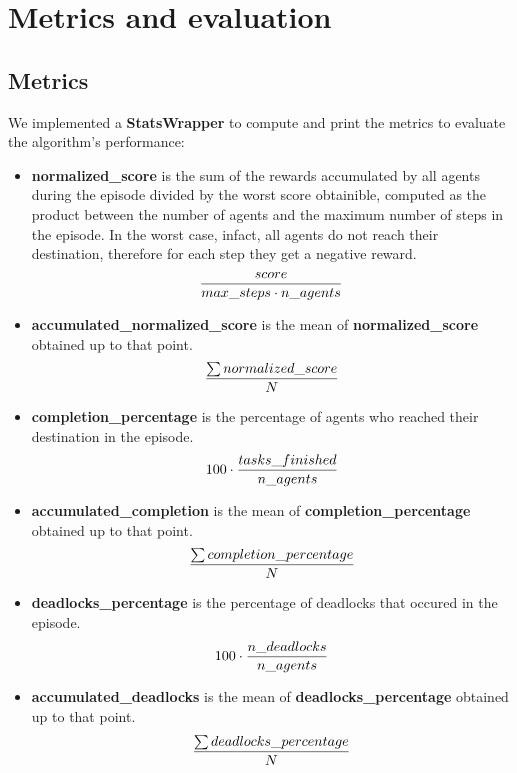 \documentclass[11pt, a4paper, hidelinks]{report}
\begin{document}
\section{Metrics and evaluation}\label{sec:metrics-and-evaluation}

\subsection{Metrics}\label{subsec:metrics}
We implemented a \textbf{StatsWrapper} to compute and print the metrics to evaluate the algorithm's performance:

\begin{itemize}
\item \textbf{normalized\_score} is the sum of the rewards accumulated by all agents during the episode divided by the worst score obtainible, computed as the product between the number of agents and the maximum number of steps in the episode. In the worst case, infact, all agents do not reach their destination, therefore for each step they get a negative reward. 
\begin{equation}{score \over {max\_steps \cdot n\_agents}}\end{equation}
\item \textbf{accumulated\_normalized\_score} is the mean of \textbf{normalized\_score} obtained up to that point. 
\begin{equation}{\sum {normalized\_score} \over N}\end{equation}
\item \textbf{completion\_percentage} is the percentage of agents who reached their destination in the episode.
\begin{equation}{100 \cdot {tasks\_finished \over n\_agents}}\end{equation}
\item \textbf{accumulated\_completion} is the mean of \textbf{completion\_percentage} obtained up to that point.
\begin{equation}{\sum {completion\_percentage} \over N}\end{equation}
\item \textbf{deadlocks\_percentage} is the percentage of deadlocks that occured in the episode.
\begin{equation}{100 \cdot {n\_deadlocks \over n\_agents}}\end{equation}
\item \textbf{accumulated\_deadlocks} is the mean of \textbf{deadlocks\_percentage} obtained up to that point.
\begin{equation}{\sum {deadlocks\_percentage} \over N}\end{equation}
\end{itemize}
\end{document}
